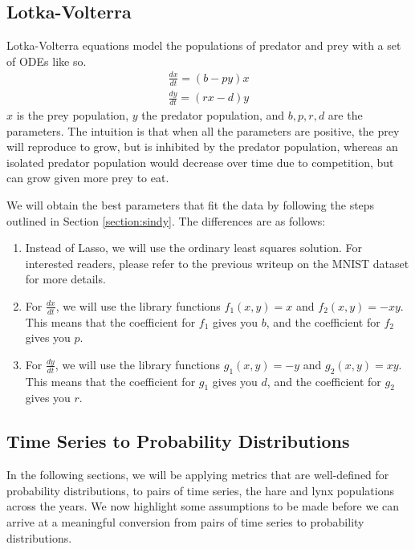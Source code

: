 \documentclass[letterpaper, 10 pt, conference]{ieeeconf}  %
\begin{document}
\subsection{Lotka-Volterra}
\label{section:lotka_volterra}
Lotka-Volterra equations model the populations of predator and prey with a set of ODEs like so.
\begin{equation}
\begin{split}
\frac{dx}{dt} = (b - py) x \\
\frac{dy}{dt} = (rx - d) y
\end{split}
\end{equation}
$x$ is the prey population, $y$ the predator population, and $b, p, r, d$ are the parameters. The intuition is that when all the parameters are positive, the prey will reproduce to grow, but is inhibited by the predator population, whereas an isolated predator population would decrease over time due to competition, but can grow given more prey to eat.

We will obtain the best parameters that fit the data by following the steps outlined in Section \ref{section:sindy}. The differences are as follows:
\begin{enumerate}
    \item Instead of Lasso, we will use the ordinary least squares solution. For interested readers, please refer to the previous writeup on the MNIST dataset for more details. 
    \item For $\frac{dx}{dt}$, we will use the library functions $f_1(x,y) = x$ and $f_2(x,y) = -xy$. This means that the coefficient for $f_1$ gives you $b$, and the coefficient for $f_2$ gives you $p$.
    \item For $\frac{dy}{dt}$, we will use the library functions $g_1(x,y) = -y$ and $g_2(x,y) = xy$. This means that the coefficient for $g_1$ gives you $d$, and the coefficient for $g_2$ gives you $r$.
\end{enumerate}

\subsection{Time Series to Probability Distributions}
\label{section:ts_to_prob}
In the following sections, we will be applying metrics that are well-defined for probability distributions, to pairs of time series, the hare and lynx populations across the years. We now highlight some assumptions to be made before we can arrive at a meaningful conversion from pairs of time series to probability distributions.
\end{document}
